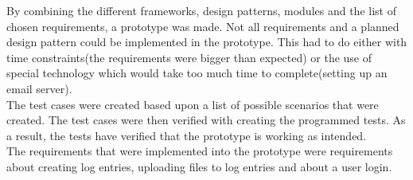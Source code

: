 \documentclass[paper=a4, fontsize=11pt,twoside]{scrartcl}	%
\begin{document}
By combining the different frameworks, design patterns, modules and the list of chosen requirements, a prototype was made. Not all requirements and a planned design pattern could be implemented in the prototype. This had to do either with time constraints(the requirements were bigger than expected) or the use of special technology which would take too much time to complete(setting up an email server). \\
The test cases were created based upon a list of possible scenarios that were created. The test cases were then verified with creating the  programmed tests. As a result, the tests have verified that the prototype is working as intended. \\
The requirements that were implemented into the prototype were requirements about creating log entries, uploading files to log entries and about a user login. 
 



\newpage
\end{document}

